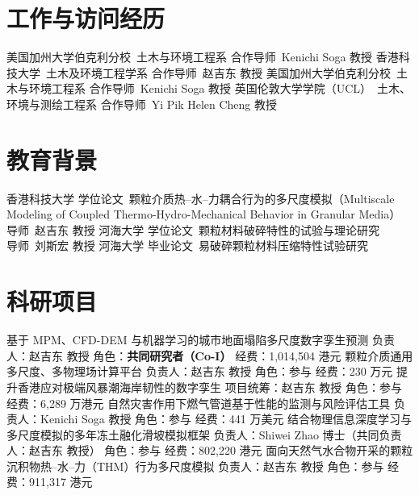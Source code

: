 \documentclass[10pt]{article}
\renewcommand{\fact}[2]{{\sffamily\footnotesize\color{muted}#1}\ {\color{ink}#2}}
\begin{document}
\section{工作与访问经历}
  {美国加州大学伯克利分校\ 土木与环境工程系}
  {\fact{合作导师}{Kenichi Soga 教授}}
  {香港科技大学\ 土木及环境工程学系}
  {\fact{合作导师}{赵吉东 教授}}
  {美国加州大学伯克利分校\ 土木与环境工程系}
  {\fact{合作导师}{Kenichi Soga 教授}}
  {英国伦敦大学学院（UCL）\ 土木、环境与测绘工程系}
  {\fact{合作导师}{Yi Pik Helen Cheng 教授}}

\section{教育背景}
  {香港科技大学}
  {\fact{学位论文}{颗粒介质热–水–力耦合行为的多尺度模拟（Multiscale Modeling of Coupled Thermo-Hydro-Mechanical Behavior in Granular Media）}\\
   \fact{导师}{赵吉东 教授}}
  {河海大学}
  {\fact{学位论文}{颗粒材料破碎特性的试验与理论研究}\\
   \fact{导师}{刘斯宏 教授}}
  {河海大学}
  {\fact{毕业论文}{易破碎颗粒材料压缩特性试验研究}}

\section{科研项目}
  {基于 MPM、CFD-DEM 与机器学习的城市地面塌陷多尺度数字孪生预测}
  {负责人：赵吉东 教授 \factsep 角色：\textbf{\color{ink}共同研究者（Co-I）} \factsep 经费：1,014,504 港元}
  {颗粒介质通用多尺度、多物理场计算平台}
  {负责人：赵吉东 教授 \factsep 角色：参与 \factsep 经费：230 万元}
  {提升香港应对极端风暴潮海岸韧性的数字孪生}
  {项目统筹：赵吉东 教授 \factsep 角色：参与 \factsep 经费：6,289 万港元}
  {自然灾害作用下燃气管道基于性能的监测与风险评估工具}
  {负责人：Kenichi Soga 教授 \factsep 角色：参与 \factsep 经费：441 万美元}
  {结合物理信息深度学习与多尺度模拟的多年冻土融化滑坡模拟框架}
  {负责人：Shiwei Zhao 博士（共同负责人：赵吉东 教授） \factsep 角色：参与 \factsep 经费：802,220 港元}
  {面向天然气水合物开采的颗粒沉积物热–水–力（THM）行为多尺度模拟}
  {负责人：赵吉东 教授 \factsep 角色：参与 \factsep 经费：911,317 港元}
\end{document}
